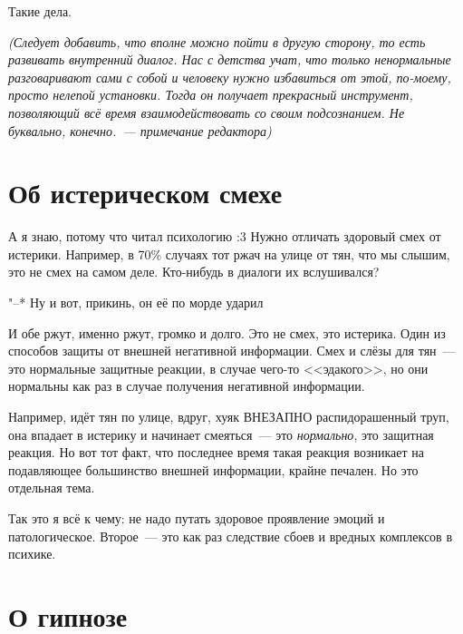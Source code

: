 \documentclass[a4paper,14pt,oneside]{memoir}
\begin{document}
Такие дела.

\smallskip

\textit{(Следует добавить, что вполне можно пойти в другую сторону, то есть развивать внутренний диалог. Нас с детства учат, что только ненормальные разговаривают сами с собой и человеку нужно избавиться от этой, по-моему, просто нелепой установки. Тогда он получает прекрасный инструмент, позволяющий всё время взаимодействовать со своим подсознанием. Не буквально, конечно.~--- примечание редактора)}




\section{Об истерическом смехе}

\medskip
А я знаю, потому что читал психологию :3 Нужно отличать здоровый смех от истерики. Например, в 70\% случаях тот ржач на улице от тян, что мы слышим, это не смех на самом деле. Кто-нибудь в диалоги их вслушивался? 

"--* Ну и вот, прикинь, он её по морде ударил

И обе ржут, именно ржут, громко и долго. Это не смех, это истерика. Один из способов защиты от внешней негативной информации. Смех и слёзы для тян~--- это нормальные защитные реакции, в случае чего-то <<эдакого>>, но они нормальны как раз в случае получения негативной информации.

Например, идёт тян по улице, вдруг, хуяк ВНЕЗАПНО распидорашенный труп, она впадает в истерику и начинает смеяться~--- это \textit{нормально}, это защитная реакция. Но вот тот факт, что последнее время такая реакция возникает на подавляющее большинство внешней информации, крайне печален. Но это отдельная тема. 

Так это я всё к чему: не надо путать здоровое проявление эмоций и патологическое. Второе~--- это как раз следствие сбоев и вредных комплексов в психике. 




\section{О гипнозе}
\end{document}
